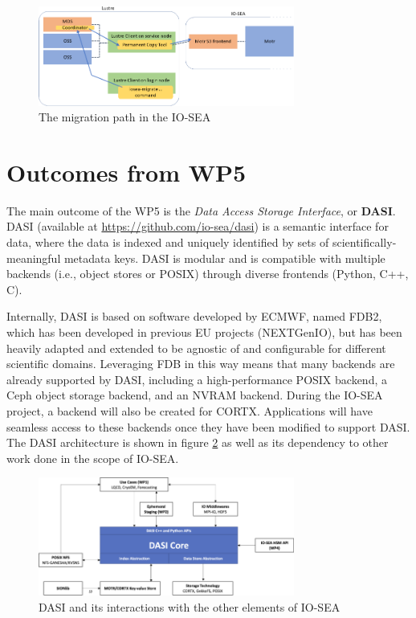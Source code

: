 \begin{figure}[H]
    \centering
    \includegraphics[width=0.75\textwidth]{FIGS/migration-path.png}
    \caption[Migration Path]{ The migration path in the IO-SEA}
    \label{fig:migration-path}
\end{figure}

\section{Outcomes from WP5}

The main outcome of the WP5 is the \textit{Data Access Storage Interface}, or \textbf{DASI}. 
DASI (available at \url{https://github.com/io-sea/dasi}) is a semantic interface for data, where the data is
indexed and uniquely identified by sets of scientifically-meaningful metadata keys. DASI is modular and is
compatible with multiple backends (i.e., object stores or POSIX) through diverse frontends (Python, C++, C).

Internally, DASI is based on software developed by ECMWF, named FDB2, which has been developed in previous EU
projects (NEXTGenIO), but has been heavily adapted and extended to be agnostic of and configurable for
different scientific domains. Leveraging FDB in this way means that many backends are already supported by DASI,
including a high-performance POSIX backend, a Ceph object storage backend, and an NVRAM backend. During the
IO-SEA project, a backend will also be created for CORTX. Applications will have seamless access to these
backends once they have been modified to support DASI. The DASI architecture is shown in figure \ref{fig:dasi}
as well as its dependency to other work done in the scope of IO-SEA.

\begin{figure}[H]
    \centering
    \includegraphics[width=0.75\textwidth]{FIGS/dasi.png}
    \caption[Migration Path]{ DASI and its interactions with the other elements of IO-SEA}
    \label{fig:dasi}
\end{figure}


